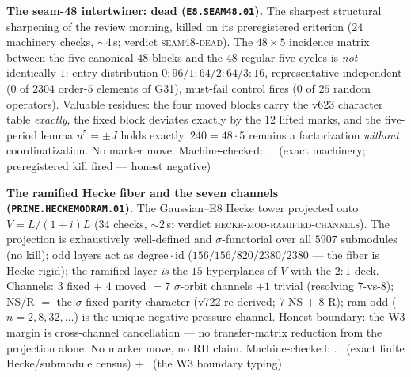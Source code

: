 \documentclass[11pt,a4paper]{article}
\theoremstyle{definition}
\begin{document}
\par\smallskip\noindent\textbf{The seam-48 intertwiner: dead
(\texttt{E8.SEAM48.01}).}
The sharpest structural sharpening of the review morning, killed on
its preregistered criterion ($24$ machinery checks, ${\sim}4$\,s;
verdict \textsc{seam48-dead}).  The $48\times5$ incidence matrix
between the five canonical $48$-blocks and the $48$ regular
five-cycles is \emph{not} identically $1$: entry distribution
$0{:}96/1{:}64/2{:}64/3{:}16$, representative-independent ($0$ of
$2304$ order-$5$ elements of G31), must-fail control fires ($0$ of
$25$ random operators).  Valuable residues: the four moved blocks
carry the v623 character table \emph{exactly}, the fixed block
deviates exactly by the $12$ lifted marks, and the five-period
lemma $u^5=\pm J$ holds exactly.  $240=48\cdot5$ remains a
factorization \emph{without} coordinatization.  No marker move.
Machine-checked: .
\mE\ (exact machinery; preregistered kill fired --- honest
negative)
\par\smallskip

\par\smallskip\noindent\textbf{The ramified Hecke fiber and the
seven channels (\texttt{PRIME.HECKEMODRAM.01}).}
The Gaussian--E8 Hecke tower projected onto $V=L/(1+i)L$ ($34$
checks, ${\sim}2$\,s; verdict
\textsc{hecke-mod-ramified-channels}).  The projection is
exhaustively well-defined and $\sigma$-functorial over all $5907$
submodules (no kill); odd layers act as
$\mathrm{degree}\cdot\mathrm{id}$ ($156/156/820/2380/2380$ --- the
fiber is Hecke-rigid); the ramified layer \emph{is} the $15$
hyperplanes of $V$ with the $2{:}1$ deck.  Channels: $3$ fixed $+$
$4$ moved $=7$ $\sigma$-orbit channels $+1$ trivial (resolving
$7$-vs-$8$); NS/R $=$ the $\sigma$-fixed parity character (v722
re-derived; $7$ NS $+$ $8$ R); ram-odd ($n=2,8,32,\ldots$) is the
unique negative-pressure channel.  Honest boundary: the W3 margin
is cross-channel cancellation --- no transfer-matrix reduction from
the projection alone.  No marker move, no RH claim.
Machine-checked: .
\mE\ (exact finite Hecke/submodule census) $+$ \mC\ (the W3
boundary typing)
\par\smallskip
\end{document}
